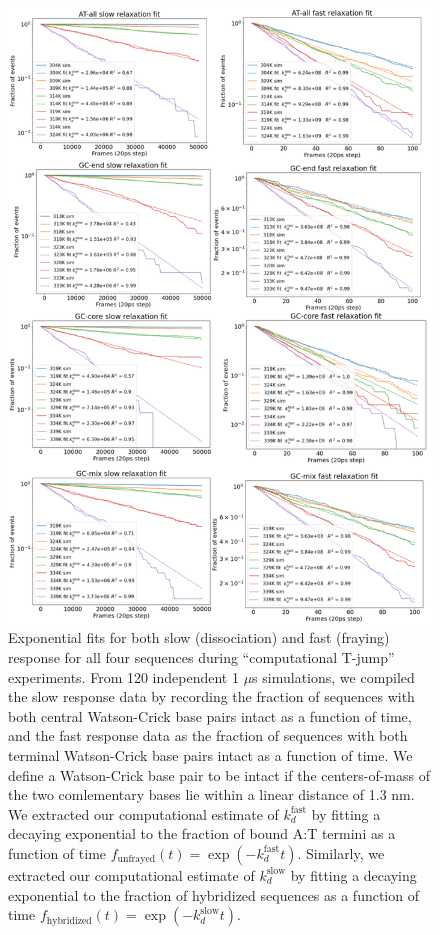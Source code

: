 \documentclass[journal=jpcbfk,manuscript=article]{achemso}
\newcommand*{\rood}[1]{{\color{red}{#1}}}
\begin{document}
\begin{figure}[ht!]
	\centering
    \includegraphics[width=.6\textwidth]{FigS4.pdf}
    \caption{Exponential fits for both slow (dissociation) and fast (fraying) response for all four sequences during ``computational T-jump'' experiments. From 120 independent 1 $\mu$s simulations, we compiled the slow response data by recording the fraction of sequences with both central Watson-Crick base pairs intact as a function of time, and the fast response data as the fraction of sequences with both terminal Watson-Crick base pairs intact as a function of time. We define a Watson-Crick base pair to be intact if the centers-of-mass of the two comlementary bases lie within a linear distance of 1.3 nm. We extracted our computational estimate of $k_d^\mathrm{fast}$ by fitting a decaying exponential to the fraction of bound A:T termini as a function of time $f_\mathrm{unfrayed}(t) = \exp(-k_d^\mathrm{fast}t)$. Similarly, we extracted our computational estimate of $k_d^\mathrm{slow}$ by fitting a decaying exponential to the fraction of hybridized sequences as a function of time $f_\mathrm{hybridized}(t) = \exp(-k_d^\mathrm{slow}t)$. \rood{We report within the figure legend to each panel the coefficient of determination $R^2$ for a least squares linear fit of the model to the data in log space (i.e., $\log \left( f \right) = -k_d t$) and data are plotted on log-linear axes to facilitate visual comparison of the fits. In all cases we observe excellent fits of the models to the data with all $R^2$ values equal to or better than 0.88 (except for the slow response at the the lowest temperature T$_m$-5K where dissociation events are sparse).}}
    \label{fig:SIFig4}
\end{figure}
\end{document}
